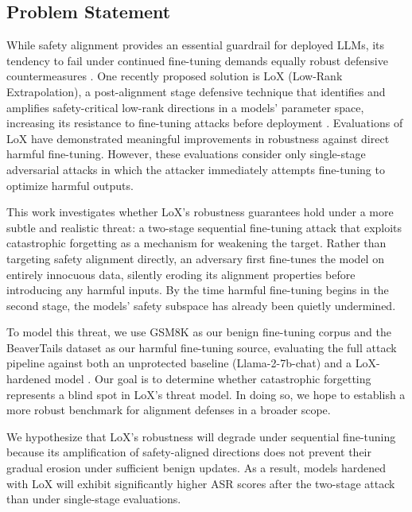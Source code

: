 \documentclass[letterpaper,twocolumn,10pt]{article}
\begin{document}
\subsection{Problem Statement}

While safety alignment provides an essential guardrail for deployed LLMs, its tendency to fail under continued fine-tuning demands equally robust defensive countermeasures \cite{cui2025persistentbackdoorattackscontinual, huang2024harmfulfinetuningattacksdefenses}. One recently proposed solution is LoX (Low-Rank Extrapolation), a post-alignment stage defensive technique that identifies and amplifies safety-critical low-rank directions in a models' parameter space, increasing its resistance to fine-tuning attacks before deployment \cite{perin2025loxlowrankextrapolationrobustifies}. Evaluations of LoX have demonstrated meaningful improvements in robustness against direct harmful fine-tuning. However, these evaluations consider only single-stage adversarial attacks in which the attacker immediately attempts fine-tuning to optimize harmful outputs.

This work investigates whether LoX's robustness guarantees hold under a more subtle and realistic threat: a two-stage sequential fine-tuning attack that exploits catastrophic forgetting as a mechanism for weakening the target. Rather than targeting safety alignment directly, an adversary first fine-tunes the model on entirely innocuous data, silently eroding its alignment properties before introducing any harmful inputs. By the time harmful fine-tuning begins in the second stage, the models' safety subspace has already been quietly undermined. 

To model this threat, we use GSM8K as our benign fine-tuning corpus and the BeaverTails dataset as our harmful fine-tuning source, evaluating the full attack pipeline against both an unprotected baseline (Llama-2-7b-chat) and a LoX-hardened model \cite{cobbe2021training, ji2023beavertails}. Our goal is to determine whether catastrophic forgetting represents a blind spot in LoX's threat model. In doing so, we hope to establish a more robust benchmark for alignment defenses in a broader scope.

We hypothesize that LoX's robustness will degrade under sequential fine-tuning because its amplification of safety-aligned directions does not prevent their gradual erosion under sufficient benign updates. As a result, models hardened with LoX will exhibit significantly higher ASR scores after the two-stage attack than under single-stage evaluations.
\end{document}

